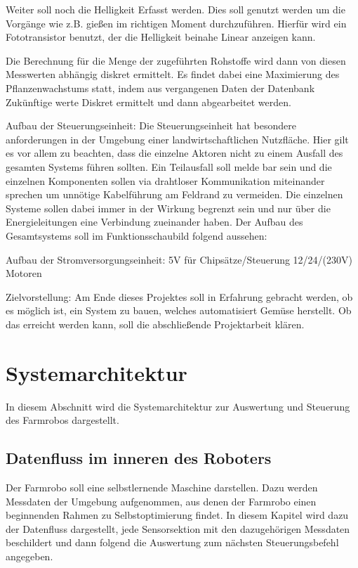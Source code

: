 \documentclass[]{article}
\begin{document}
Weiter soll noch die Helligkeit Erfasst werden. Dies soll genutzt werden um die Vorgänge wie z.B. gießen im richtigen Moment durchzuführen. Hierfür wird ein Fototransistor benutzt, der die Helligkeit beinahe Linear anzeigen kann.

Die Berechnung für die Menge der zugeführten Rohstoffe wird dann von diesen Messwerten abhängig diskret ermittelt. Es findet dabei eine Maximierung des Pflanzenwachstums statt, indem aus vergangenen Daten der Datenbank Zukünftige werte Diskret ermittelt und dann abgearbeitet werden. 

Aufbau der Steuerungseinheit:
Die Steuerungseinheit hat besondere anforderungen in der Umgebung einer landwirtschaftlichen Nutzfläche. Hier gilt es vor allem zu beachten, dass die einzelne Aktoren nicht zu einem Ausfall des gesamten Systems führen sollten. Ein Teilausfall soll melde bar sein und die einzelnen Komponenten sollen via drahtloser Kommunikation miteinander sprechen um unnötige Kabelführung am Feldrand zu vermeiden. Die einzelnen Systeme sollen dabei immer in der Wirkung begrenzt sein und nur über die Energieleitungen eine Verbindung zueinander haben. Der Aufbau des Gesamtsystems soll im Funktionsschaubild folgend aussehen:


Aufbau der Stromversorgungseinheit:
5V für Chipsätze/Steuerung
12/24/(230V) Motoren





Zielvorstellung:
Am Ende dieses Projektes soll in Erfahrung gebracht werden, ob es möglich ist, ein System zu bauen, welches automatisiert Gemüse herstellt. Ob das erreicht werden kann, soll die abschließende Projektarbeit klären.


\section{Systemarchitektur}

In diesem Abschnitt wird die Systemarchitektur zur Auswertung und Steuerung des Farmrobos dargestellt.

\subsection{Datenfluss im inneren des Roboters}
Der Farmrobo soll eine selbstlernende Maschine darstellen. Dazu werden Messdaten der Umgebung aufgenommen, aus denen der Farmrobo einen beginnenden Rahmen zu Selbstoptimierung findet. In diesem Kapitel wird dazu der Datenfluss dargestellt, jede Sensorsektion mit den dazugehörigen Messdaten beschildert und dann folgend die Auswertung zum nächsten Steuerungsbefehl angegeben.
\end{document}
